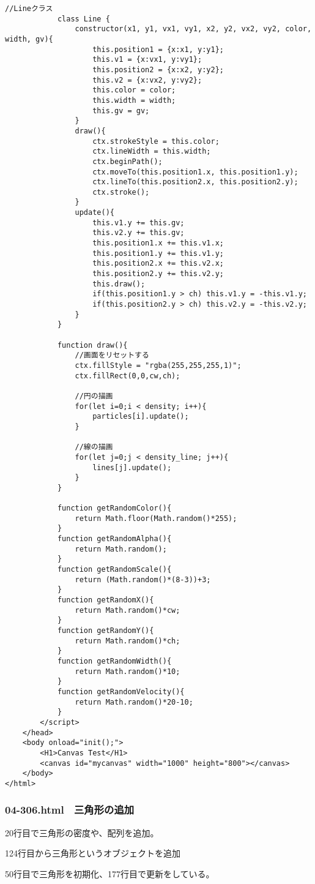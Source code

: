 \documentclass[mingoth,11pt,a4j,uplatex]{jsarticle}
\begin{document}
\begin{lstlisting}[caption=線の追加]
			//Lineクラス
			class Line {
				constructor(x1, y1, vx1, vy1, x2, y2, vx2, vy2, color, width, gv){
					this.position1 = {x:x1, y:y1};
					this.v1 = {x:vx1, y:vy1};
					this.position2 = {x:x2, y:y2};
					this.v2 = {x:vx2, y:vy2};
					this.color = color;
					this.width = width;
					this.gv = gv;
				}
				draw(){
					ctx.strokeStyle = this.color;
					ctx.lineWidth = this.width;
					ctx.beginPath();
					ctx.moveTo(this.position1.x, this.position1.y);
					ctx.lineTo(this.position2.x, this.position2.y);
					ctx.stroke();
				}
				update(){
					this.v1.y += this.gv;
					this.v2.y += this.gv;
					this.position1.x += this.v1.x;
					this.position1.y += this.v1.y;
					this.position2.x += this.v2.x;
					this.position2.y += this.v2.y;
					this.draw();
					if(this.position1.y > ch) this.v1.y = -this.v1.y;
					if(this.position2.y > ch) this.v2.y = -this.v2.y;
				}
			}
			
			function draw(){
				//画面をリセットする
				ctx.fillStyle = "rgba(255,255,255,1)";
				ctx.fillRect(0,0,cw,ch);
				
				//円の描画
				for(let i=0;i < density; i++){
					particles[i].update();
				}
				
				//線の描画
				for(let j=0;j < density_line; j++){
					lines[j].update();
				}
			}

			function getRandomColor(){
				return Math.floor(Math.random()*255);
			}
			function getRandomAlpha(){
				return Math.random();
			}
			function getRandomScale(){
				return (Math.random()*(8-3))+3;
			}
			function getRandomX(){
				return Math.random()*cw;
			}
			function getRandomY(){
				return Math.random()*ch;
			}
			function getRandomWidth(){
				return Math.random()*10;
			}
			function getRandomVelocity(){
				return Math.random()*20-10;
			}
		</script>
	</head>
	<body onload="init();">
		<H1>Canvas Test</H1>
		<canvas id="mycanvas" width="1000" height="800"></canvas>
	</body>
</html>
\end{lstlisting}

\subsubsection{04-306.html　三角形の追加}
20行目で三角形の密度や、配列を追加。

124行目から三角形というオブジェクトを追加

50行目で三角形を初期化、177行目で更新をしている。
\end{document}
